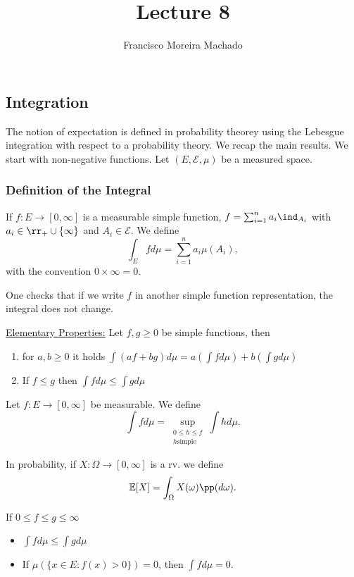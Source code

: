 \documentclass[../main.tex]{subfiles}
\author{Francisco Moreira Machado}
\title{Lecture 8}
\begin{document}
\subsection{Integration}
The notion of expectation is defined in probability theorey using the Lebesgue integration with
respect to a probability theory. We recap the main results.
\vspace{0.3em}
We start with non-negative functions. Let $(E, \mathcal{E}, \mu)$ be a
measured space.
\subsubsection{Definition of the Integral}
\begin{definition}
  If $f \colon E \to [0, \infty]$ is a measurable simple function, $f
  = \sum_{i=1}^n a_i \ind_{A_i}$ with $a_i \in \rr_+ \cup \{ \infty \}
  $ and $A_i \in \mathcal{E}$. We define 
  \[
    \int_{E} f d\mu = \sum_{i=1}^n a_i \mu(A_i)
  ,\] 
  with the convention $0 \times \infty = 0$.
\end{definition}

One checks that if we write $f$ in another simple function
representation, the integral does not change.

\underline{\sffamily Elementary Properties:} Let $f, g \geq 0$ be
simple functions, then
\begin{enumerate}
  \item for $a, b \geq 0$ it holds $\int (af + bg)d\mu = a(\int fd\mu) +
    b (\int gd\mu)$
  \item If $f \leq g$ then $\int f d\mu \leq \int g d\mu $
\end{enumerate}

\begin{definition}
  Let $f \colon E \to [0, \infty]$ be measurable. We define
  \[
    \int f d\mu = \sup_{\substack{0 \leq h \leq f \\ h \text{
      simple}}} \int h d\mu
  .\] 
\end{definition}

\begin{definition}
  [Expectation]
  In probability, if $X \colon \Omega \to [0, \infty]$ is a rv. we
  define
  \[
    \mathbb{E}[X] = \int_{\Omega} X(\omega) \pp(d\omega)
  .\] 
\end{definition}

\begin{proposition}
    If $0 \leq f \leq g \leq \infty $
    \begin{itemize}
      \item $\int f d\mu \leq \int g d\mu$
      \item If $\mu(\{ x \in E \colon f(x) > 0 \} ) = 0$, then $\int f
        d\mu = 0$.
    \end{itemize}
\end{proposition}
\end{document}
